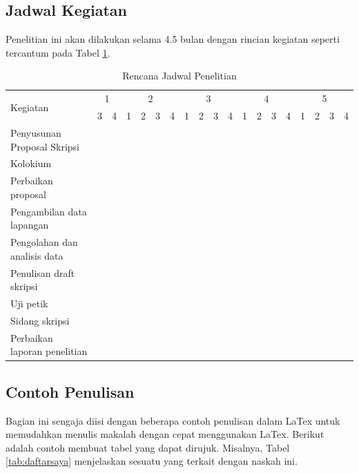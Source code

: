 \subsection*{Jadwal Kegiatan}
Penelitian ini akan dilakukan selama 4.5 bulan dengan rincian kegiatan seperti tercantum pada Tabel \ref{tab:jadwal}.
\begin{table}[t!]
	\begin{center}
		\caption{Rencana Jadwal Penelitian}
		\label{tab:jadwal}
		\footnotesize
		\begin{tabular}{|l|c|c|c|c|c|c|c|c|c|c|c|c|c|c|c|c|c|c|}
			\hline
			\multirow{2}{*}{Kegiatan}&\multicolumn{2}{c|}{1}&\multicolumn{4}{c|}{2}&\multicolumn{4}{c|}{3}&\multicolumn{4}{c|}{4}&\multicolumn{4}{c|}{5}\\
			\cline{2-19}
			&3&4&1&2&3&4&1&2&3&4&1&2&3&4&1&2&3&4\\
			\hline
			Penyusunan Proposal Skripsi&\cellcolor{black}&\cellcolor{black}&\cellcolor{black}&\cellcolor{black}&&&&&&&&&&&&&&\\
			\hline
			Kolokium&&&&&\cellcolor{black}&&&&&&&&&&&&&\\
			\hline
			Perbaikan proposal&&&&&&\cellcolor{black}&&&&&&&&&&&&\\
			\hline
			Pengambilan data lapangan&&&&&&\cellcolor{black}&\cellcolor{black}&\cellcolor{black}&&&&&&&&&&\\
			\hline
			Pengolahan dan analisis data&&&&&&&&\cellcolor{black}&\cellcolor{black}&\cellcolor{black}&\cellcolor{black}&&&&&&&\\
			\hline
			Penulisan draft skripsi&&&&&&&&&&&&\cellcolor{black}&\cellcolor{black}&\cellcolor{black}&\cellcolor{black}&&&\\
			\hline
			Uji petik&&&&&&&&&&&&&&&&\cellcolor{black}&&\\
			\hline
			Sidang skripsi&&&&&&&&&&&&&&&&&\cellcolor{black}&\\
			\hline
			Perbaikan laporan penelitian&&&&&&&&&&&&&&&&&&\cellcolor{black}\\
			\hline
		\end{tabular}
		\normalsize
	\end{center}
\end{table}


\subsection*{Contoh Penulisan}

Bagian ini sengaja diisi dengan beberapa contoh penulisan dalam LaTex untuk memudahkan menulis makalah dengan cepat menggunakan LaTex. Berikut adalah contoh membuat tabel yang dapat dirujuk. Misalnya, Tabel \ref{tab:daftarsaya} menjelaskan sesuatu yang terkait dengan naskah ini.


